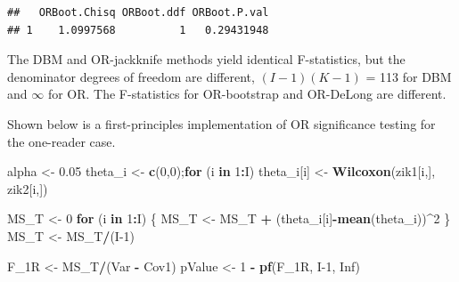 \documentclass[
]{book}
\newenvironment{Shaded}{\begin{snugshade}}{\end{snugshade}}
\newcommand{\ControlFlowTok}[1]{\textcolor[rgb]{0.13,0.29,0.53}{\textbf{#1}}}
\newcommand{\DecValTok}[1]{\textcolor[rgb]{0.00,0.00,0.81}{#1}}
\newcommand{\FloatTok}[1]{\textcolor[rgb]{0.00,0.00,0.81}{#1}}
\newcommand{\KeywordTok}[1]{\textcolor[rgb]{0.13,0.29,0.53}{\textbf{#1}}}
\newcommand{\NormalTok}[1]{#1}
\newcommand{\OperatorTok}[1]{\textcolor[rgb]{0.81,0.36,0.00}{\textbf{#1}}}
\newcommand{\OtherTok}[1]{\textcolor[rgb]{0.56,0.35,0.01}{#1}}
\newcommand{\StringTok}[1]{\textcolor[rgb]{0.31,0.60,0.02}{#1}}
\begin{document}
\begin{verbatim}
##   ORBoot.Chisq ORBoot.ddf ORBoot.P.val
## 1    1.0997568          1   0.29431948
\end{verbatim}

The DBM and OR-jackknife methods yield identical F-statistics, but the denominator degrees of freedom are different, \((I-1)(K-1)\) = 113 for DBM and \(\infty\) for OR. The F-statistics for OR-bootstrap and OR-DeLong are different.

Shown below is a first-principles implementation of OR significance testing for the one-reader case.

\begin{Shaded}
\begin{Highlighting}[]
\NormalTok{alpha <-}\StringTok{ }\FloatTok{0.05}
\NormalTok{theta_i <-}\StringTok{ }\KeywordTok{c}\NormalTok{(}\DecValTok{0}\NormalTok{,}\DecValTok{0}\NormalTok{);}\ControlFlowTok{for}\NormalTok{ (i }\ControlFlowTok{in} \DecValTok{1}\OperatorTok{:}\NormalTok{I) theta_i[i] <-}\StringTok{ }\KeywordTok{Wilcoxon}\NormalTok{(zik1[i,], zik2[i,])}

\NormalTok{MS_T <-}\StringTok{ }\DecValTok{0}
\ControlFlowTok{for}\NormalTok{ (i }\ControlFlowTok{in} \DecValTok{1}\OperatorTok{:}\NormalTok{I) \{}
\NormalTok{  MS_T <-}\StringTok{ }\NormalTok{MS_T }\OperatorTok{+}\StringTok{ }\NormalTok{(theta_i[i]}\OperatorTok{-}\KeywordTok{mean}\NormalTok{(theta_i))}\OperatorTok{^}\DecValTok{2}
\NormalTok{\}}
\NormalTok{MS_T <-}\StringTok{ }\NormalTok{MS_T}\OperatorTok{/}\NormalTok{(I}\DecValTok{-1}\NormalTok{)}

\NormalTok{F_1R <-}\StringTok{ }\NormalTok{MS_T}\OperatorTok{/}\NormalTok{(Var }\OperatorTok{-}\StringTok{ }\NormalTok{Cov1)}
\NormalTok{pValue <-}\StringTok{ }\DecValTok{1} \OperatorTok{-}\StringTok{ }\KeywordTok{pf}\NormalTok{(F_1R, I}\DecValTok{-1}\NormalTok{, }\OtherTok{Inf}\NormalTok{)}


\end{Highlighting}
\end{Shaded}
\end{document}
